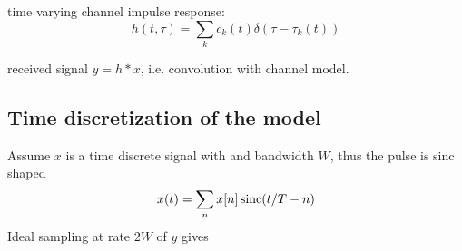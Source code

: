 time varying channel impulse response:
\begin{equation}
	h(t, \tau) = \sum_k c_k (t) \delta(\tau - \tau_k(t))
\end{equation}

received signal \(y = h * x\), i.e. convolution with channel model. 

\subsection{Time discretization of the model}


Assume \(x\) is a time discrete signal with and bandwidth \(W\), thus the pulse is sinc shaped
\begin{equation}
	x(t) = \sum_n x[n] \operatorname{sinc}(t/T - n)
\end{equation}
Ideal sampling at rate \(2W\) of \(y\) gives
